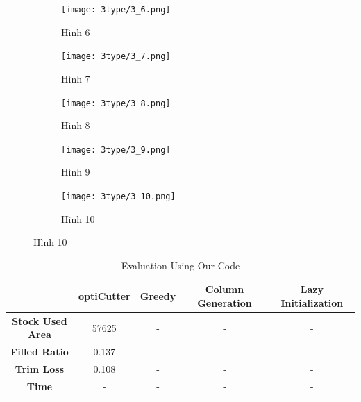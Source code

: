 \documentclass[a4paper]{article}
\begin{document}
\begin{figure}[H] %
  \centering
  \captionsetup{justification=centering, font=small} %
  
  \begin{subfigure}[b]{0.48\textwidth}
    \centering
    \texttt{[image: 3type/3\_6.png]}
    \caption{Hình 6}
    \label{fig:6}
  \end{subfigure}
  \hfill
  \begin{subfigure}[b]{0.48\textwidth}
    \centering
    \texttt{[image: 3type/3\_7.png]}
    \caption{Hình 7}
    \label{fig:7}
  \end{subfigure}
  
  \vspace{0.1cm} %
  
  \begin{subfigure}[b]{0.48\textwidth}
    \centering
    \texttt{[image: 3type/3\_8.png]}
    \caption{Hình 8}
    \label{fig:8}
  \end{subfigure}
  \hfill
  \begin{subfigure}[b]{0.48\textwidth}
    \centering
    \texttt{[image: 3type/3\_9.png]}
    \caption{Hình 9}
    \label{fig:9}
  \end{subfigure}
  
  \vspace{10cm}
  
  \begin{subfigure}[b]{0.48\textwidth}
    \centering
    \texttt{[image: 3type/3\_10.png]}
    \caption{Hình 10}
    \label{fig:10}
  \end{subfigure}
  
  \label{fig:all_images_part2}
\end{figure}
 \begin{table}[H]
        \centering
        \caption{Evaluation Using Our Code}
        \begin{tabular}{|c|c|c|c|c|}
            \hline
            \textbf{} & \textbf{optiCutter} & \textbf{Greedy} & \textbf{Column Generation} & \textbf{Lazy Initialization} \\ \hline
            \textbf{Stock Used Area} & 57625 & - & - & - \\ \hline
            \textbf{Filled Ratio} & 0.137 & - & - & - \\ \hline
            \textbf{Trim Loss} & 0.108 & - & - & - \\ \hline
            \textbf{Time} & - & - & - & - \\ \hline
        \end{tabular}
\end{table}   
\end{document}
